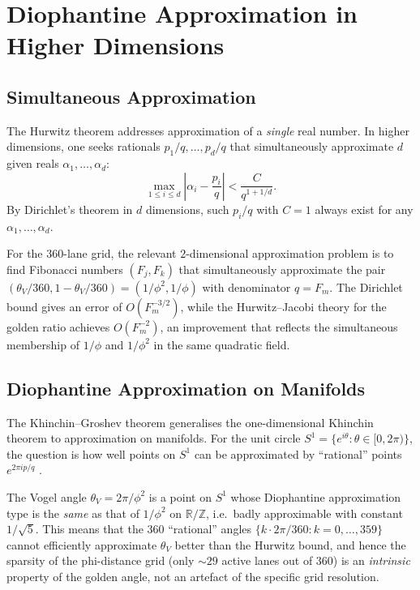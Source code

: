 \section{Diophantine Approximation in Higher Dimensions}
\label{sec:diophantine-higher-dim}

\subsection{Simultaneous Approximation}
\label{subsec:simultaneous}

The Hurwitz theorem addresses approximation of a
\emph{single} real number.  In higher dimensions,
one seeks rationals $p_1/q, \ldots, p_d/q$ that
simultaneously approximate $d$ given reals
$\alpha_1, \ldots, \alpha_d$:
\[
  \max_{1 \leq i \leq d}
  \left|\alpha_i - \frac{p_i}{q}\right|
  < \frac{C}{q^{1+1/d}}.
\]
By Dirichlet's theorem in $d$ dimensions, such
$p_i/q$ with $C = 1$ always exist for any
$\alpha_1, \ldots, \alpha_d$.

For the 360-lane grid, the relevant
$2$-dimensional approximation problem is to
find Fibonacci numbers $(F_j, F_k)$ that
simultaneously approximate the pair
$(\theta_V/360, 1 - \theta_V/360) = (1/\phi^2, 1/\phi)$
with denominator $q = F_m$.  The Dirichlet bound
gives an error of $O(F_m^{-3/2})$, while the
Hurwitz--Jacobi theory for the golden ratio
achieves $O(F_m^{-2})$, an improvement that
reflects the simultaneous membership of
$1/\phi$ and $1/\phi^2$ in the same quadratic
field.

\subsection{Diophantine Approximation on Manifolds}
\label{subsec:approx-manifolds}

The Khinchin--Groshev theorem generalises the
one-dimensional Khinchin theorem to
approximation on manifolds.  For the unit circle
$S^1 = \{e^{i\theta} : \theta \in [0, 2\pi)\}$,
the question is how well points on $S^1$ can be
approximated by ``rational'' points
$e^{2\pi i p/q}$ \cite{khinchin_continued_fractions}.

The Vogel angle $\theta_V = 2\pi/\phi^2$ is a
point on $S^1$ whose Diophantine approximation
type is the \emph{same} as that of $1/\phi^2$
on $\mathbb{R}/\mathbb{Z}$, i.e.\ badly
approximable with constant $1/\sqrt{5}$.  This
means that the 360 ``rational'' angles
$\{k\cdot 2\pi/360 : k = 0, \ldots, 359\}$ cannot
efficiently approximate $\theta_V$ better than
the Hurwitz bound, and hence the sparsity of the
phi-distance grid (only $\sim 29$ active lanes out
of 360) is an \emph{intrinsic} property of the
golden angle, not an artefact of the specific
grid resolution.

